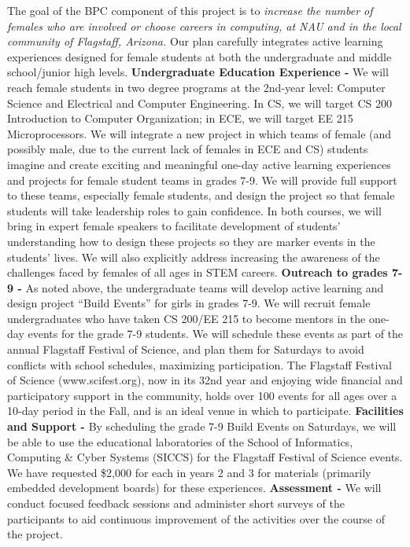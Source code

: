 The goal of the BPC component of this project is to \textit{increase the number of females who are involved or choose careers in computing, at NAU and in the local community of Flagstaff, Arizona.}  Our plan carefully integrates active learning experiences designed for female students at both the undergraduate and middle school/junior high levels.
\textbf{Undergraduate Education Experience -} We will reach female students in two degree programs at the 2nd-year level: Computer Science and Electrical and Computer Engineering. In CS, we will target CS 200 Introduction to Computer Organization; in ECE, we will target EE 215 Microprocessors. We will integrate a new project in which teams of female (and possibly male, due to the current lack of females in ECE and CS) students imagine and create exciting and meaningful one-day active learning experiences and projects for female student teams in grades 7-9.  We will provide full support to these teams, especially female students, and design the project so that female students will take leadership roles to gain confidence.  In both courses, we will bring in expert female speakers to facilitate development of students’ understanding how to design these projects so they are marker events in the students’ lives. We will also explicitly address increasing the awareness of the challenges faced by females of all ages in STEM careers.
\textbf{Outreach to grades 7-9 -} As noted above, the undergraduate teams will develop active learning and design project “Build Events” for girls in grades 7-9. We will recruit female undergraduates who have taken CS 200/EE 215 to become mentors in the one-day events for the grade 7-9 students.  We will schedule these events as part of the annual Flagstaff Festival of Science, and plan them for Saturdays to avoid conflicts with school schedules, maximizing participation. The Flagstaff Festival of Science (www.scifest.org), now in its 32nd year and enjoying wide financial and participatory support in the community, holds over 100 events for all ages over a 10-day period in the Fall, and is an ideal venue in which to participate.
\textbf{Facilities and Support -} By scheduling the grade 7-9 Build Events on Saturdays, we will be able to use the educational laboratories of the School of Informatics, Computing \& Cyber Systems (SICCS) for the Flagstaff Festival of Science events. We have requested \$2,000 for each in years 2 and 3 for materials (primarily embedded development boards) for these experiences.
\textbf{Assessment -} We will conduct focused feedback sessions and administer short surveys of the participants to aid continuous improvement of the activities over the course of the project.